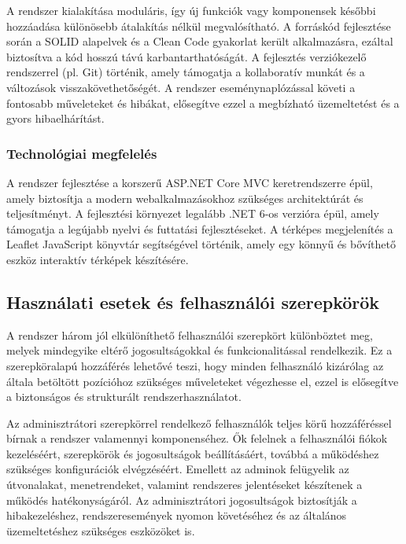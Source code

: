 A rendszer kialakítása moduláris, így új funkciók vagy komponensek későbbi hozzáadása különösebb átalakítás nélkül megvalósítható. A forráskód fejlesztése során a SOLID alapelvek és a Clean Code gyakorlat került alkalmazásra, ezáltal biztosítva a kód hosszú távú karbantarthatóságát. A fejlesztés verziókezelő rendszerrel (pl. Git) történik, amely támogatja a kollaboratív munkát és a változások visszakövethetőségét. A rendszer eseménynaplózással követi a fontosabb műveleteket és hibákat, elősegítve ezzel a megbízható üzemeltetést és a gyors hibaelhárítást.

\subsubsection{Technológiai megfelelés}

A rendszer fejlesztése a korszerű ASP.NET Core MVC keretrendszerre épül, amely biztosítja a modern webalkalmazásokhoz szükséges architektúrát és teljesítményt. A fejlesztési környezet legalább .NET 6-os verzióra épül, amely támogatja a legújabb nyelvi és futtatási fejlesztéseket. A térképes megjelenítés a Leaflet JavaScript könyvtár segítségével történik, amely egy könnyű és bővíthető eszköz interaktív térképek készítésére.

\newpage
\subsection{Használati esetek és felhasználói szerepkörök}

A rendszer három jól elkülöníthető felhasználói szerepkört különböztet meg, melyek mindegyike eltérő jogosultságokkal és funkcionalitással rendelkezik. Ez a szerepköralapú hozzáférés lehetővé teszi, hogy minden felhasználó kizárólag az általa betöltött pozícióhoz szükséges műveleteket végezhesse el, ezzel is elősegítve a biztonságos és strukturált rendszerhasználatot.

Az adminisztrátori szerepkörrel rendelkező felhasználók teljes körű hozzáféréssel bírnak a rendszer valamennyi komponenséhez. Ők felelnek a felhasználói fiókok kezeléséért, szerepkörök és jogosultságok beállításáért, továbbá a működéshez szükséges konfigurációk elvégzéséért. Emellett az adminok felügyelik az útvonalakat, menetrendeket, valamint rendszeres jelentéseket készítenek a működés hatékonyságáról. Az adminisztrátori jogosultságok biztosítják a hibakezeléshez, rendszeresemények nyomon követéséhez és az általános üzemeltetéshez szükséges eszközöket is.

